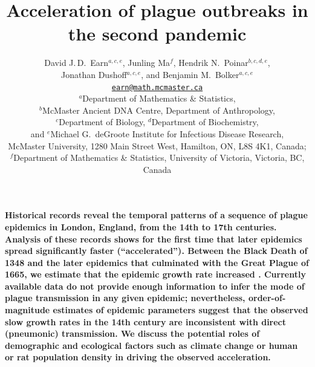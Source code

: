 \title{Acceleration of plague outbreaks in the second pandemic}

\author{David J.\,D.\ Earn$^{a,c,e}$, 
Junling Ma$^{f}$, 
Hendrik N.\ Poinar$^{b,c,d,e}$,\\
Jonathan Dushoff$^{a,c,e}$,
and Benjamin M.\ Bolker$^{a,c,e}$\\
\href{mailto:earn@math.mcmaster.ca}{\tt earn@math.mcmaster.ca}\\
\small $^a$Department of Mathematics \& Statistics,\\
\small $^b$McMaster Ancient DNA Centre, Department of Anthropology,\\
\small $^c$Department of Biology, $^d$Department of Biochemistry,\\
\small and $^e$Michael G.\ deGroote Institute for Infectious Disease Research,\\
\small McMaster University, 1280 Main Street West, Hamilton, ON, L8S 4K1, Canada;\\
\small $^f$Department of Mathematics \& Statistics, University of Victoria, Victoria, BC, Canada}



\linenumbers

\maketitle

{\bfseries
\noindent
Historical records reveal the temporal patterns of a sequence of plague epidemics in London, England, from the 14th to 17th centuries.  Analysis of these records shows for the first time that later epidemics spread significantly faster (``accelerated'').  Between the Black Death of 1348 and the later epidemics that culminated with the Great Plague of 1665, we estimate that the epidemic growth rate increased \foldval.
Currently available data do not provide enough information to infer the mode of plague transmission in any given epidemic; nevertheless, order-of-magnitude estimates of epidemic parameters suggest that the observed slow growth rates in the 14th century are inconsistent with direct (pneumonic) transmission.  
We discuss the potential roles of demographic and ecological factors such as climate change or human or rat population density in driving the observed acceleration.
}  

